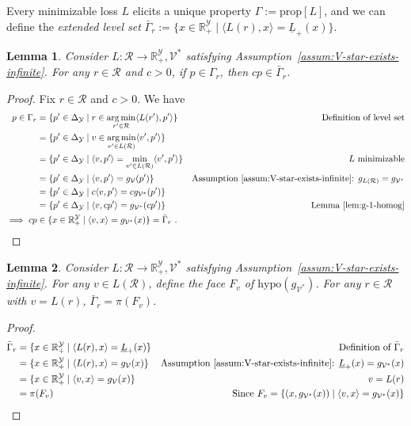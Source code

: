 \documentclass[11pt]{article}
\newcommand{\reals}{\mathbb{R}}
\newcommand{\prop}[1]{\mathrm{prop}[#1]}
\newcommand{\simplex}{\Delta_\Y}
\newcommand{\R}{\mathcal{R}}
\newcommand{\V}{\mathcal{V}}
\newcommand{\Y}{\mathcal{Y}}
\newcommand{\risk}[1]{\underline{#1}}
\newcommand{\inprod}[2]{\langle #1, #2 \rangle}%
\newcommand{\hyp}{\mathrm{hypo}}
\DeclareMathOperator*{\argmin}{arg\,min}
\newtheorem{lemma}{Lemma}
\begin{document}
Every minimizable loss $L$ elicits a unique property $\Gamma := \prop{L}$, and we can define the \emph{extended level set} $\bar \Gamma_r := \{x \in \reals^\Y_+ \mid \inprod{L(r)}{x} = \risk L_+(x)\}$.

\begin{lemma}\label{lem:levelset-to-extended-levelset}
	Consider $L: \R \to \reals^\Y_+, \V^*$ satisfying Assumption~\ref{assum:V-star-exists-infinite}.
	For any $r \in \R$ and $c > 0$, if $p \in \Gamma_r$, then $cp \in \bar \Gamma_r$. 
\end{lemma}
\begin{proof}
	Fix $r \in \R$ and $c > 0$.
	We have
	\begin{align*}
	p \in \Gamma_r
	&= \{p' \in \simplex \mid r \in \argmin_{r' \in \R} \inprod{L(r')}{p'} \} & \text {Definition of level set} \\
	&= \{p' \in \simplex \mid v \in \argmin_{v' \in L(\R)} \inprod{v'}{p'} \} &  \\
	&= \{p' \in \simplex \mid \inprod{v}{p'} = \min_{v' \in L(\R)} \inprod{v'}{p'} \} & \text {$L$ minimizable} \\
	&= \{p' \in \simplex \mid \inprod{v}{p'} = g_\V(p') \} & \text {Assumption~\ref{assum:V-star-exists-infinite}: $g_{L(\R)} = g_{\V^*}$} \\
	&= \{p' \in \simplex \mid c \inprod{v}{p'} = c g_{\V^*}(p') \} &  \\
	&= \{p' \in \simplex \mid  \inprod{v}{cp'} = g_{\V^*}(cp') \} & \text {Lemma~\ref{lem:g-1-homog}} \\
	\implies cp
	&\in \{x \in \reals^\Y_+ \mid \inprod{v}{x} = g_{\V^*}(x)\} = \bar \Gamma_r~.~
	\end{align*}
\end{proof}

\begin{lemma}\label{lem:extended-levelset-equals-projected-face}
	Consider $L : \R \to \reals^\Y_+, \V^*$ satisfying Assumption~\ref{assum:V-star-exists-infinite}.
	For any $v \in L(\R)$, define the face $F_v$ of $\hyp(g_{\V^*})$.
	For any $r\in \R$ with $v = L(r)$, $\bar \Gamma_r = \pi(F_v)$.  
\end{lemma}
\begin{proof}
	\begin{align*}
	\bar \Gamma_r
	&= \{x \in \reals^\Y_+ \mid \inprod{L(r)}{x} = \risk L_+(x)\} & \text{Definition of $\bar \Gamma_r$}\\
	&= \{x \in \reals^\Y_+ \mid \inprod{L(r)}{x} = g_\V(x)\} & \text{Assumption~\ref{assum:V-star-exists-infinite}: $\risk L_+(x) = g_{\V^*}(x)$}\\
	&= \{x \in \reals^\Y_+ \mid \inprod{v}{x} = g_\V(x)\} & \text{$v = L(r)$}\\
	&= \pi(F_v) & \text{Since $F_v = \{(x,g_{\V^*}(x)) \mid \inprod{v}{x} = g_{\V^*}(x)\}$}\\
	\end{align*}
\end{proof}
\end{document}
